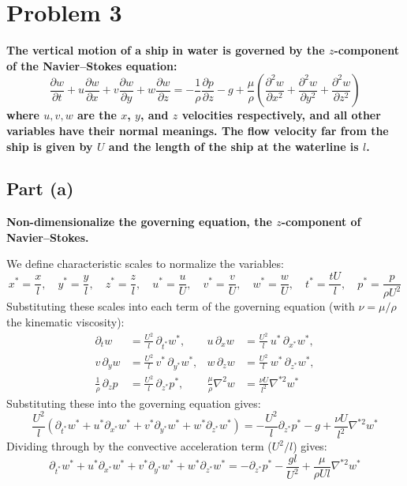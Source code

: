 \documentclass[12pt]{article}
\newcommand{\pd}[2]{\frac{\partial #1}{\partial #2}}
\begin{document}
\section*{Problem 3}
\textbf{The vertical motion of a ship in water is governed by the $z$-component of the Navier--Stokes equation:}
\begin{equation*}
    \pd{w}{t} + u\pd{w}{x} + v\pd{w}{y} + w\pd{w}{z} = -\frac{1}{\rho}\pd{p}{z} - g + \frac{\mu}{\rho}\left(\frac{\partial^2 w}{\partial x^2} + \frac{\partial^2 w}{\partial y^2} + \frac{\partial^2 w}{\partial z^2}\right)
\end{equation*}
\textbf{where $u, v, w$ are the $x$, $y$, and $z$ velocities respectively, and all other variables have their normal meanings. The flow velocity far from the ship is given by $U$ and the length of the ship at the waterline is $l$.}

\subsection*{Part (a)}
\textbf{Non-dimensionalize the governing equation, the $z$-component of Navier--Stokes.}

We define characteristic scales to normalize the variables:
\begin{equation*}
    x^* = \frac{x}{l}, \quad y^* = \frac{y}{l}, \quad z^* = \frac{z}{l}, \quad u^* = \frac{u}{U}, \quad v^* = \frac{v}{U}, \quad w^* = \frac{w}{U}, \quad t^* = \frac{tU}{l}, \quad p^* = \frac{p}{\rho U^2}
\end{equation*}
Substituting these scales into each term of the governing equation (with $\nu = \mu/\rho$ the kinematic viscosity):
\begin{align*}
    \partial_t w &= \frac{U^2}{l}\,\partial_{t^*} w^*, &
    u\,\partial_x w &= \frac{U^2}{l}\,u^*\,\partial_{x^*} w^*, \\
    v\,\partial_y w &= \frac{U^2}{l}\,v^*\,\partial_{y^*} w^*, &
    w\,\partial_z w &= \frac{U^2}{l}\,w^*\,\partial_{z^*} w^*, \\
    \frac{1}{\rho}\,\partial_z p &= \frac{U^2}{l}\,\partial_{z^*} p^*, &
    \frac{\mu}{\rho}\nabla^2 w &= \frac{\nu U}{l^2}\nabla^{*2} w^*
\end{align*}
Substituting these into the governing equation gives:
\begin{equation*}
    \frac{U^2}{l}\left(\partial_{t^*} w^* + u^*\partial_{x^*} w^* + v^*\partial_{y^*} w^* + w^*\partial_{z^*} w^*\right) = -\frac{U^2}{l}\partial_{z^*} p^* - g + \frac{\nu U}{l^2}\nabla^{*2}w^*
\end{equation*}
Dividing through by the convective acceleration term ($U^2/l$) gives:
\begin{equation}
    \boxed{
    \partial_{t^*} w^* + u^*\partial_{x^*} w^* + v^*\partial_{y^*} w^* + w^*\partial_{z^*} w^* = -\partial_{z^*} p^* - \frac{g l}{U^2} + \frac{\mu}{\rho U l} \nabla^{*2} w^*
    }
\end{equation}
\end{document}
